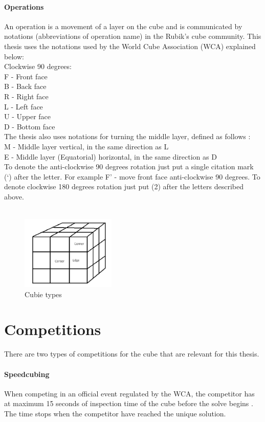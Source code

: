 \documentclass[a4paper,11pt]{kth-mag}
\begin{document}
\paragraph{Operations}

An operation is a movement of a layer on the cube and is communicated by notations (abbreviations of operation name) in the Rubik's cube community. This thesis uses the notations used by the World Cube Association (WCA) \cite{WCA1} explained below:\\
Clockwise 90 degrees:\\
F - Front face\\
B - Back face\\
R - Right face\\
L - Left face\\
U - Upper face\\
D - Bottom face\\
The thesis also uses notations for turning the middle layer, defined as follows \cite{Ruwix}:\\
M - Middle layer vertical, in the same direction as L\\
E - Middle layer (Equatorial) horizontal, in the same direction as D\\
To denote the anti-clockwise 90 degrees rotation just put a single citation mark (‘) after the letter. For example F’ - move front face anti-clockwise 90 degrees.
To denote clockwise 180 degrees rotation just put (2) after the letters described above.\\\\


\begin{figure}[t]
	\centering
	\includegraphics[width= 0.4\textwidth]{figs/representation.png}
	\caption{Cubie types}
	\label{fig_3}
\end{figure}
\section{Competitions}
There are two types of competitions for the cube that are relevant for this thesis.
\paragraph{Speedcubing}
When competing in an official event regulated by the WCA, the competitor has at maximum 15 seconds of inspection time of the cube before the solve begins \cite{WCA2}. The time stops when the competitor have reached the unique solution. 
\end{document}
